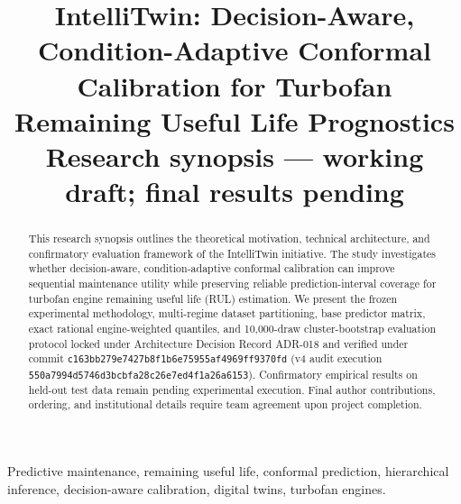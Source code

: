 \documentclass[conference]{IEEEtran}
\begin{document}
\title{IntelliTwin: Decision-Aware, Condition-Adaptive Conformal Calibration for Turbofan Remaining Useful Life Prognostics \\
\large \vspace{0.3em} \textbf{Research synopsis --- working draft; final results pending}}

\author{
  \and
  \and
}

\maketitle

\begin{abstract}
This research synopsis outlines the theoretical motivation, technical architecture, and confirmatory evaluation framework of the IntelliTwin initiative. The study investigates whether decision-aware, condition-adaptive conformal calibration can improve sequential maintenance utility while preserving reliable prediction-interval coverage for turbofan engine remaining useful life (RUL) estimation. We present the frozen experimental methodology, multi-regime dataset partitioning, base predictor matrix, exact rational engine-weighted quantiles, and 10,000-draw cluster-bootstrap evaluation protocol locked under Architecture Decision Record ADR-018 and verified under commit \texttt{c163bb279e7427b8f1b6e75955af4969ff9370fd} (v4 audit execution \texttt{550a7994d5746d3bcbfa28c26e7ed4f1a26a6153}). Confirmatory empirical results on held-out test data remain pending experimental execution. Final author contributions, ordering, and institutional details require team agreement upon project completion.
\end{abstract}

\begin{IEEEkeywords}
Predictive maintenance, remaining useful life, conformal prediction, hierarchical inference, decision-aware calibration, digital twins, turbofan engines.
\end{IEEEkeywords}











\end{document}
